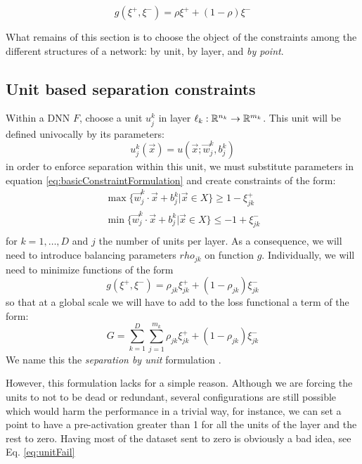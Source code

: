 \begin{equation}\label{eq:definitionOfRho}
    g(\xi^{+},\xi^{-}) = \rho\xi^{+}+(1-\rho)\xi^{-}
\end{equation}

What remains of this section is to choose the object of the constraints among the different structures of a network: by unit, by layer, and \emph{by point}.

\subsection{Unit based separation constraints \SepUnit}\label{subsec:sepUnit}
Within a \ReLU DNN $F$, choose a unit $u_j^k$ in layer $\ell_k:\mathbb{R}^{n_k}\rightarrow\mathbb{R}^{m_k}$. This unit will be defined univocally by its parameters:
\begin{equation}\label{eq:unitSepParameterWriting}
    u^k_j(\vec{x}) = u(\vec{x};\vec{w}^k_j,b^k_j)
\end{equation}
in order to enforce separation within this unit, we must substitute parameters in equation \ref{eq:basicConstraintFormulation} and create constraints of the form:
\begin{equation}
    \begin{array}{lcl}
    \max\{\vec{w}^k_j\cdot\vec{x}+b^k_j|\vec{x}\in X\}\geq 1-\xi^{+}_{jk}\\
    \min\{\vec{w}^k_j\cdot\vec{x}+b^k_j|\vec{x}\in X\}\leq -1+\xi^{-}_{jk}\\
\end{array}
\end{equation}
for $k=1,\ldots,D$ and $j$ the number of units per layer. As a consequence, we will need to introduce balancing parameters $rho_{jk}$ on function $g$. Individually, we will need to minimize functions of the form
\begin{equation}
    g(\xi^{+},\xi^{-}) = \rho_{jk}\xi^{+}_{jk}+(1-\rho_{jk})\xi^{-}_{jk}
\end{equation}
so that at a global scale we will have to add to the loss functional a term of the form:
\begin{equation}\label{eq:constraintLossForUnitSeparation}
    G = \sum_{k=1}^{D}\sum_{j=1}^{m_k}\rho_{jk}\xi^{+}_{jk}+(1-\rho_{jk})\xi^{-}_{jk}
\end{equation}
We name this the \emph{separation by unit} formulation \SepUnit.

However, this formulation lacks for a simple reason. Although we are forcing the units to not to be dead or redundant, several configurations are still possible which would harm the performance in a trivial way, for instance, we can set a point to have a pre-activation greater than 1 for all the units of the layer and the rest to zero. Having most of the dataset sent to zero is obviously a bad idea, see Eq. \ref{eq:unitFail}

